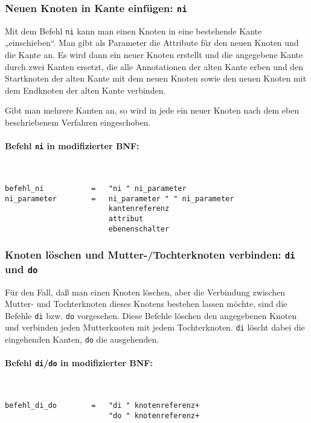 \documentclass[12pt]{scrartcl}
\begin{document}
\subsubsection{Neuen Knoten in Kante einfügen: \texttt{ni}}

Mit dem Befehl \texttt{ni} kann man einen Knoten in eine bestehende Kante „einschieben“. Man gibt als Parameter die Attribute für den neuen Knoten und die Kante an. Es wird dann ein neuer Knoten erstellt und die angegebene Kante durch zwei Kanten ersetzt, die alle Annotationen der alten Kante erben und den Startknoten der alten Kante mit dem neuen Knoten sowie den neuen Knoten mit dem Endknoten der alten Kante verbinden.

Gibt man mehrere Kanten an, so wird in jede ein neuer Knoten nach dem eben beschriebenem Verfahren eingeschoben.

\paragraph*{Befehl \texttt{ni} in modifizierter BNF:}
~
\begin{framed}
\begin{lstlisting}
befehl_ni           =   "ni " ni_parameter
ni_parameter        =   ni_parameter " " ni_parameter
                        kantenreferenz
                        attribut
                        ebenenschalter
\end{lstlisting}
\end{framed}


\subsubsection{Knoten löschen und Mutter-/Tochterknoten verbinden: \texttt{di} und \texttt{do}}

Für den Fall, daß man einen Knoten löschen, aber die Verbindung zwischen Mutter- und Tochterknoten dieses Knotens bestehen lassen möchte, sind die Befehle \texttt{di} bzw. \texttt{do} vorgesehen. Diese Befehle löschen den angegebenen Knoten und verbinden jeden Mutterknoten mit jedem Tochterknoten. \texttt{di} löscht dabei die eingehenden Kanten, \texttt{do} die ausgehenden.

\paragraph*{Befehl \texttt{di}/\texttt{do} in modifizierter BNF:}
~
\begin{framed}
\begin{lstlisting}
befehl_di_do        =   "di " knotenreferenz+
                        "do " knotenreferenz+
\end{lstlisting}
\end{framed}
\end{document}
